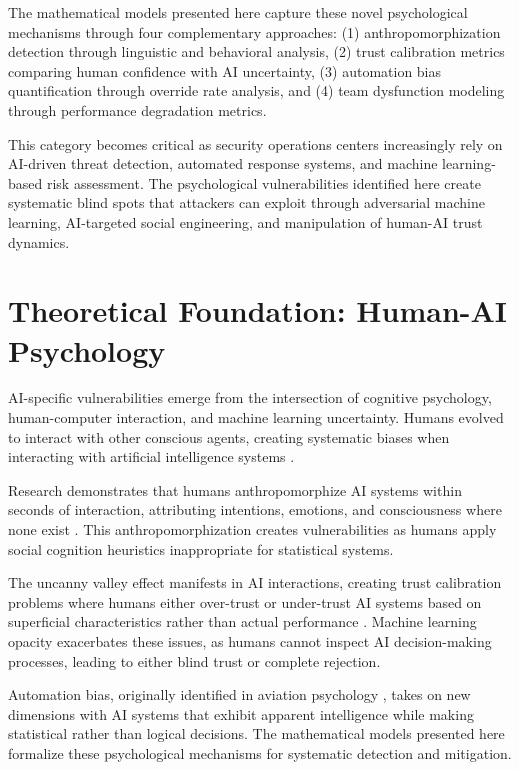 \documentclass[11pt,a4paper]{article}
\begin{document}
The mathematical models presented here capture these novel psychological mechanisms through four complementary approaches: (1) anthropomorphization detection through linguistic and behavioral analysis, (2) trust calibration metrics comparing human confidence with AI uncertainty, (3) automation bias quantification through override rate analysis, and (4) team dysfunction modeling through performance degradation metrics.

This category becomes critical as security operations centers increasingly rely on AI-driven threat detection, automated response systems, and machine learning-based risk assessment. The psychological vulnerabilities identified here create systematic blind spots that attackers can exploit through adversarial machine learning, AI-targeted social engineering, and manipulation of human-AI trust dynamics.

\section{Theoretical Foundation: Human-AI Psychology}

AI-specific vulnerabilities emerge from the intersection of cognitive psychology, human-computer interaction, and machine learning uncertainty. Humans evolved to interact with other conscious agents, creating systematic biases when interacting with artificial intelligence systems \cite{reeves1996}.

Research demonstrates that humans anthropomorphize AI systems within seconds of interaction, attributing intentions, emotions, and consciousness where none exist \cite{waytz2014}. This anthropomorphization creates vulnerabilities as humans apply social cognition heuristics inappropriate for statistical systems.

The uncanny valley effect manifests in AI interactions, creating trust calibration problems where humans either over-trust or under-trust AI systems based on superficial characteristics rather than actual performance \cite{mori1970}. Machine learning opacity exacerbates these issues, as humans cannot inspect AI decision-making processes, leading to either blind trust or complete rejection.

Automation bias, originally identified in aviation psychology \cite{parasuraman1997}, takes on new dimensions with AI systems that exhibit apparent intelligence while making statistical rather than logical decisions. The mathematical models presented here formalize these psychological mechanisms for systematic detection and mitigation.
\end{document}
